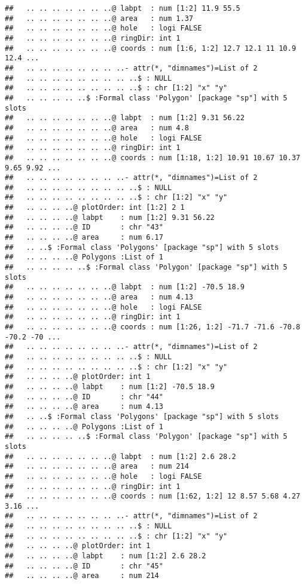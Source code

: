 \documentclass[]{article}
\begin{document}
\begin{verbatim}
##   .. .. .. .. .. .. ..@ labpt  : num [1:2] 11.9 55.5
##   .. .. .. .. .. .. ..@ area   : num 1.37
##   .. .. .. .. .. .. ..@ hole   : logi FALSE
##   .. .. .. .. .. .. ..@ ringDir: int 1
##   .. .. .. .. .. .. ..@ coords : num [1:6, 1:2] 12.7 12.1 11 10.9 12.4 ...
##   .. .. .. .. .. .. .. ..- attr(*, "dimnames")=List of 2
##   .. .. .. .. .. .. .. .. ..$ : NULL
##   .. .. .. .. .. .. .. .. ..$ : chr [1:2] "x" "y"
##   .. .. .. .. ..$ :Formal class 'Polygon' [package "sp"] with 5 slots
##   .. .. .. .. .. .. ..@ labpt  : num [1:2] 9.31 56.22
##   .. .. .. .. .. .. ..@ area   : num 4.8
##   .. .. .. .. .. .. ..@ hole   : logi FALSE
##   .. .. .. .. .. .. ..@ ringDir: int 1
##   .. .. .. .. .. .. ..@ coords : num [1:18, 1:2] 10.91 10.67 10.37 9.65 9.92 ...
##   .. .. .. .. .. .. .. ..- attr(*, "dimnames")=List of 2
##   .. .. .. .. .. .. .. .. ..$ : NULL
##   .. .. .. .. .. .. .. .. ..$ : chr [1:2] "x" "y"
##   .. .. .. ..@ plotOrder: int [1:2] 2 1
##   .. .. .. ..@ labpt    : num [1:2] 9.31 56.22
##   .. .. .. ..@ ID       : chr "43"
##   .. .. .. ..@ area     : num 6.17
##   .. ..$ :Formal class 'Polygons' [package "sp"] with 5 slots
##   .. .. .. ..@ Polygons :List of 1
##   .. .. .. .. ..$ :Formal class 'Polygon' [package "sp"] with 5 slots
##   .. .. .. .. .. .. ..@ labpt  : num [1:2] -70.5 18.9
##   .. .. .. .. .. .. ..@ area   : num 4.13
##   .. .. .. .. .. .. ..@ hole   : logi FALSE
##   .. .. .. .. .. .. ..@ ringDir: int 1
##   .. .. .. .. .. .. ..@ coords : num [1:26, 1:2] -71.7 -71.6 -70.8 -70.2 -70 ...
##   .. .. .. .. .. .. .. ..- attr(*, "dimnames")=List of 2
##   .. .. .. .. .. .. .. .. ..$ : NULL
##   .. .. .. .. .. .. .. .. ..$ : chr [1:2] "x" "y"
##   .. .. .. ..@ plotOrder: int 1
##   .. .. .. ..@ labpt    : num [1:2] -70.5 18.9
##   .. .. .. ..@ ID       : chr "44"
##   .. .. .. ..@ area     : num 4.13
##   .. ..$ :Formal class 'Polygons' [package "sp"] with 5 slots
##   .. .. .. ..@ Polygons :List of 1
##   .. .. .. .. ..$ :Formal class 'Polygon' [package "sp"] with 5 slots
##   .. .. .. .. .. .. ..@ labpt  : num [1:2] 2.6 28.2
##   .. .. .. .. .. .. ..@ area   : num 214
##   .. .. .. .. .. .. ..@ hole   : logi FALSE
##   .. .. .. .. .. .. ..@ ringDir: int 1
##   .. .. .. .. .. .. ..@ coords : num [1:62, 1:2] 12 8.57 5.68 4.27 3.16 ...
##   .. .. .. .. .. .. .. ..- attr(*, "dimnames")=List of 2
##   .. .. .. .. .. .. .. .. ..$ : NULL
##   .. .. .. .. .. .. .. .. ..$ : chr [1:2] "x" "y"
##   .. .. .. ..@ plotOrder: int 1
##   .. .. .. ..@ labpt    : num [1:2] 2.6 28.2
##   .. .. .. ..@ ID       : chr "45"
##   .. .. .. ..@ area     : num 214

\end{verbatim}
\end{document}
